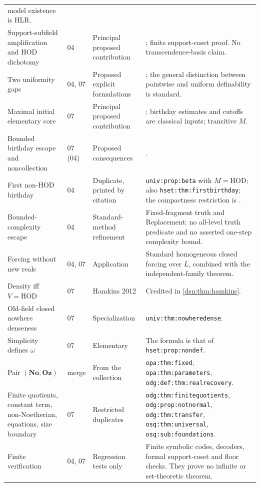 \documentclass[11pt,a4paper]{article}
\numberwithin{equation}{section}
\theoremstyle{definition}
\theoremstyle{remark}
\newcommand{\No}{\mathbf{No}}
\newcommand{\Oz}{\mathbf{Oz}}
\newcommand{\HOD}{\mathrm{HOD}}
\newcommand{\lbl}[1]{\nolinkurl{#1}}
\begin{document}
\begin{longtable}{@{}P{0.27\textwidth}P{0.10\textwidth}P{0.23\textwidth}P{0.32\textwidth}@{}}
model existence is HLR.\\
Support-subfield amplification and HOD dichotomy & 04 & Principal proposed
contribution & ; finite
support-coset proof. No transcendence-basis claim.\\
Two uniformity gaps & 04, 07 & Proposed explicit formulations &
;
the general distinction between pointwise and uniform definability is
standard.\\
Maximal initial elementary core & 07 & Principal proposed contribution &
; birthday
estimates and cutoffs are classical inputs; transitive $M$.\\
Bounded birthday escape and noncollection & 07 (04) & Proposed
consequences & .\\
First non-HOD birthday & 04 & Duplicate, printed by citation &
\lbl{univ:prop:beta} with $M=\HOD$; also \lbl{hset:thm:firstbirthday}; the
compactness restriction is \cite{BCHGP2026}.\\
Bounded-complexity escape & 04 & Standard-method refinement &
Fixed-fragment truth and Replacement; no all-level truth predicate and no
asserted one-step complexity bound.\\
Forcing without new reals & 04, 07 & Application & Standard homogeneous
closed forcing over $L$, combined with the independent-family theorem.\\
Density iff $V=\HOD$ & 07 & Hamkins 2012 & Credited in
\cref{dsn:thm:hamkins}.\\
Old-field closed nowhere denseness & 07 & Specialization &
\lbl{univ:thm:nowheredense}.\\
Simplicity defines $\omega$ & 07 & Elementary & The formula is that of
\lbl{hset:prop:nondef}.\\
Pair $(\No,\Oz)$ & merge & From the collection & \lbl{opa:thm:fixed},
\lbl{opa:thm:parameters}, \lbl{odg:def:thm:realrecovery}.\\
Finite quotients, constant term, non-Noetherian, equations, size boundary &
07 & Restricted duplicates & \lbl{odg:thm:finitequotients},
\lbl{odg:prop:notnormal}, \lbl{odg:thm:transfer}, \lbl{osq:thm:universal},
\lbl{osq:sub:foundations}.\\
Finite verification & 04, 07 & Regression tests only & Finite symbolic codes,
decoders, formal support-coset and floor checks. They prove no infinite or
set-theoretic theorem.\\
\bottomrule
\end{longtable}
\end{document}
